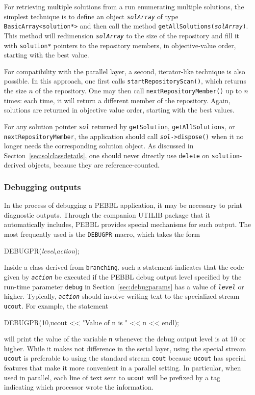 For retrieving multiple solutions from a run enumerating multiple
solutions, the simplest technique is to define an object
\texttt{\emph{solArray}} of type \texttt{BasicArray<solution*>} and
then call the method \texttt{getAllSolutions(\emph{solArray})}.  This
method will redimension \texttt{\emph{solArray}} to the size of the
repository and fill it with \texttt{solution*} pointers to the
repository members, in objective-value order, starting with the best
value.

For compatibility with the parallel layer, a second, iterator-like
technique is also possible.  In this approach, one first calls
\texttt{startRepositoryScan()}, which returns the size $n$ of the
repository.  One may then call \texttt{nextRepositoryMember()} up to
$n$ times: each time, it will return a different member of the
repository.  Again, solutions are returned in objective value order,
starting with the best values.

For any solution pointer \emph{\texttt{sol}} returned by \texttt{getSolution},
\texttt{getAllSolutions}, or \texttt{next\-Repos\-itory\-Member}, the application
should call \texttt{\emph{sol}->dispose()} when it no longer needs the
corresponding solution object.  As discussed in
Section~\ref{sec:solclassdetails}, one should never directly use
\texttt{delete} on \texttt{solution}-derived objects, because they are
reference-counted.

\subsubsection{Debugging outputs}
\label{sec:debugOutput}
In the process of debugging a PEBBL application, it may be necessary
to print diagnostic outputs.  Through the companion UTILIB package
that it automatically includes, PEBBL provides special mechanisms for
such output.  The most frequently used is the \texttt{DEBUGPR} macro,
which takes the form
\begin{codeblock}
DEBUGPR(\textit{level},\textit{action});
\end{codeblock}
Inside a class derived from \texttt{branching}, such a statement
indicates that the code given by \texttt{\textit{action}} be executed
if the PEBBL debug output level specified by the run-time parameter
\texttt{debug} in Section~\ref{sec:debugparams} has a value of
\texttt{\textit{level}} or higher.  Typically,
\texttt{\textit{action}} should involve writing text to the
specialized stream \texttt{ucout}.  For example, the statement
\begin{codeblock}
DEBUGPR(10,ucout << "Value of n is " << n << endl);
\end{codeblock}
will print the value of the variable \texttt{n} whenever the debug output
level is at 10 or higher.  While it makes not difference in the serial
layer, using the special stream \texttt{ucout} is preferable to using
the standard stream \texttt{cout} because \texttt{ucout} has special
features that make it more convenient in a parallel setting.  In
particular, when used in parallel, each line of text sent to
\texttt{ucout} will be prefixed by a tag indicating which processor
wrote the information.

